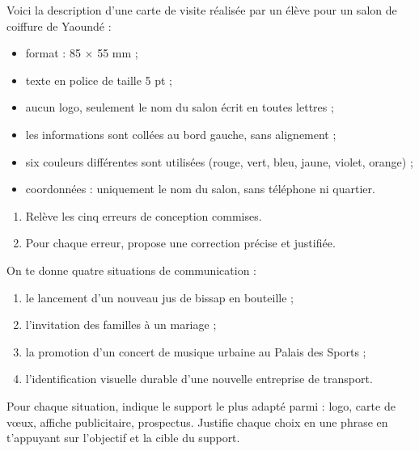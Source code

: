 \documentclass[11pt]{article}
\begin{document}
\begin{exercice}
Voici la description d'une carte de visite réalisée par un élève pour un salon de coiffure de Yaoundé :
\begin{itemize}
\item format : 85 $\times$ 55 mm ;
\item texte en police de taille 5 pt ;
\item aucun logo, seulement le nom du salon écrit en toutes lettres ;
\item les informations sont collées au bord gauche, sans alignement ;
\item six couleurs différentes sont utilisées (rouge, vert, bleu, jaune, violet, orange) ;
\item coordonnées : uniquement le nom du salon, sans téléphone ni quartier.
\end{itemize}
\begin{enumerate}
\item Relève les cinq erreurs de conception commises.
\item Pour chaque erreur, propose une correction précise et justifiée.
\end{enumerate}
\end{exercice}

\begin{exercice}
On te donne quatre situations de communication :
\begin{enumerate}
\item le lancement d'un nouveau jus de bissap en bouteille ;
\item l'invitation des familles à un mariage ;
\item la promotion d'un concert de musique urbaine au Palais des Sports ;
\item l'identification visuelle durable d'une nouvelle entreprise de transport.
\end{enumerate}
Pour chaque situation, indique le support le plus adapté parmi : logo, carte de vœux, affiche publicitaire, prospectus. Justifie chaque choix en une phrase en t'appuyant sur l'objectif et la cible du support.
\end{exercice}
\end{document}
